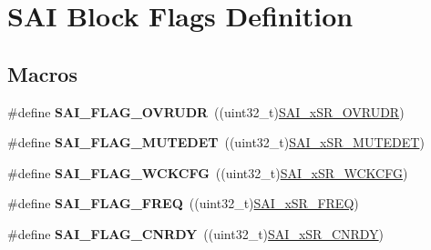 \hypertarget{group___s_a_i___block___flags___definition}{}\section{S\+AI Block Flags Definition}
\label{group___s_a_i___block___flags___definition}
\subsection*{Macros}
\begin{DoxyCompactItemize}
\item 
\#define {\bfseries S\+A\+I\+\_\+\+F\+L\+A\+G\+\_\+\+O\+V\+R\+U\+DR}~((uint32\+\_\+t)\hyperlink{group___peripheral___registers___bits___definition_gac935e26343913d548d1fa4a1d53d37df}{S\+A\+I\+\_\+x\+S\+R\+\_\+\+O\+V\+R\+U\+DR})\hypertarget{group___s_a_i___block___flags___definition_ga73a644c89e4d85c73dee4b7cb549c953}{}\label{group___s_a_i___block___flags___definition_ga73a644c89e4d85c73dee4b7cb549c953}

\item 
\#define {\bfseries S\+A\+I\+\_\+\+F\+L\+A\+G\+\_\+\+M\+U\+T\+E\+D\+ET}~((uint32\+\_\+t)\hyperlink{group___peripheral___registers___bits___definition_ga92f97a8a22c3301d76e3704fb70d1234}{S\+A\+I\+\_\+x\+S\+R\+\_\+\+M\+U\+T\+E\+D\+ET})\hypertarget{group___s_a_i___block___flags___definition_ga8c833c8a8ce7c0a1ccdd5039e7f519f5}{}\label{group___s_a_i___block___flags___definition_ga8c833c8a8ce7c0a1ccdd5039e7f519f5}

\item 
\#define {\bfseries S\+A\+I\+\_\+\+F\+L\+A\+G\+\_\+\+W\+C\+K\+C\+FG}~((uint32\+\_\+t)\hyperlink{group___peripheral___registers___bits___definition_gac85199d384ead397bc7e5874b948e798}{S\+A\+I\+\_\+x\+S\+R\+\_\+\+W\+C\+K\+C\+FG})\hypertarget{group___s_a_i___block___flags___definition_ga55bd1fe573d3c9bbe0cff452f891e6a3}{}\label{group___s_a_i___block___flags___definition_ga55bd1fe573d3c9bbe0cff452f891e6a3}

\item 
\#define {\bfseries S\+A\+I\+\_\+\+F\+L\+A\+G\+\_\+\+F\+R\+EQ}~((uint32\+\_\+t)\hyperlink{group___peripheral___registers___bits___definition_gab5530f57526edd6dc0d2774042f8f5cc}{S\+A\+I\+\_\+x\+S\+R\+\_\+\+F\+R\+EQ})\hypertarget{group___s_a_i___block___flags___definition_ga6a3c55ec333b3ff0fb98765a2faa7c1a}{}\label{group___s_a_i___block___flags___definition_ga6a3c55ec333b3ff0fb98765a2faa7c1a}

\item 
\#define {\bfseries S\+A\+I\+\_\+\+F\+L\+A\+G\+\_\+\+C\+N\+R\+DY}~((uint32\+\_\+t)\hyperlink{group___peripheral___registers___bits___definition_ga59176cbf38a7bf9913215ca9cc716da7}{S\+A\+I\+\_\+x\+S\+R\+\_\+\+C\+N\+R\+DY})\hypertarget{group___s_a_i___block___flags___definition_gac4fb573c4279dab77807b7d26595b262}{}\label{group___s_a_i___block___flags___definition_gac4fb573c4279dab77807b7d26595b262}


\end{DoxyCompactItemize}
